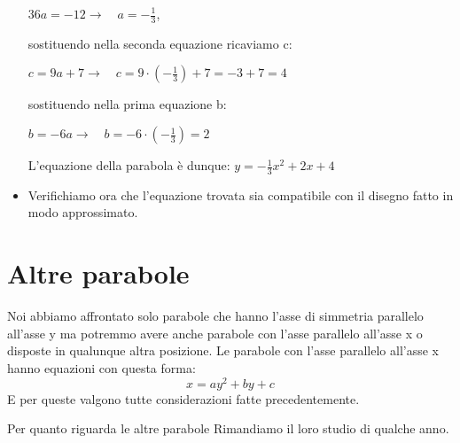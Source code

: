 \begin{esempio}
\begin{itemize}
\(36a=-12 \rightarrow \quad a=-\frac{1}{3}\), 

sostituendo nella seconda equazione ricaviamo c:

\(c= 9a+7 \rightarrow \quad c=9 \cdot \left(- \frac{1}{3} \right) +7=-3+7=4\)

sostituendo nella prima equazione b:

\(b=-6a \rightarrow \quad b=-6 \cdot \left(- \frac{1}{3} \right)=2\)

L'equazione della parabola è dunque: \(y=-\frac{1}{3}x^2+2x+4\)

  \item Verifichiamo ora che l'equazione trovata sia compatibile con il disegno 
  fatto in modo approssimato.
 \end{itemize}
\end{esempio}


\section{Altre parabole}
\label{sec:parabola_altreparabole}

Noi abbiamo affrontato solo parabole che hanno l'asse di simmetria parallelo 
all'asse y ma potremmo avere anche parabole con l'asse parallelo all'asse x
o disposte in qualunque altra posizione.
Le parabole con l'asse parallelo all'asse x hanno equazioni con questa forma:
\[x=ay^2+by+c\]
E per queste valgono tutte considerazioni fatte precedentemente.

Per quanto riguarda le altre parabole Rimandiamo il loro studio di qualche 
anno.

